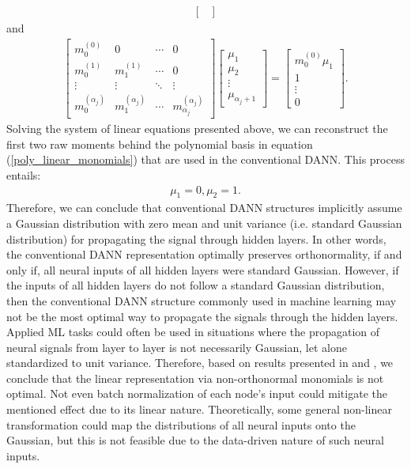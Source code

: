 \documentclass[a4paper,fleqn]{article}
\newcommand{\rw}[1]{\textcolor{blue}{#1}}
\newcommand{\del}[1]{\textcolor{red}{\sout{#1}}}
\renewcommand{\del}[1]{}
\renewcommand{\rw}[1]{#1}
\begin{document}
{\begin{eqnarray}
\begin{bmatrix}
\end{bmatrix} \nonumber
\end{eqnarray}
and 
\begin{eqnarray}
\begin{bmatrix}
m_0^{(0)} & 0 & \cdots & 0 \\
m_0^{(1)} & m_1^{(1)} & \cdots & 0 \\
\vdots & \vdots & \ddots & \vdots \\
m_0^{(\alpha_j)} & m_1^{(\alpha_j)} &\cdots & m_{\alpha_j}^{(\alpha_j)}
\end{bmatrix}
\begin{bmatrix}
\mu_1 \\ \mu_2 \\ \vdots \\ \mu_{\alpha_j+1}
\end{bmatrix}
=
\begin{bmatrix}
m_0^{(0)}\mu_1\\ 1 \\  \vdots \\ 0
\end{bmatrix}.\nonumber
\end{eqnarray}
}
\rw{Solving the system of linear equations presented above, we can} reconstruct the first two raw moments behind the polynomial basis in equation (\ref{poly_linear_monomials}) \rw{that are used in the conventional DANN. This process entails}:
%
\begin{eqnarray}
\label{DANN_monomials}
  \mu_1=0, \mu_2=1.
\end{eqnarray}
%
Therefore, we can conclude that conventional DANN structures implicitly assume a Gaussian distribution with zero mean and unit variance \rw{(i.e. standard Gaussian distribution)} for propagating the signal through hidden layers. In other words, the conventional DANN representation \rw{optimally preserves orthonormality}, if and only if, all neural inputs of all hidden layers were standard Gaussian. \rw{However, if the inputs of all hidden layers do not follow a standard Gaussian distribution, then the conventional DANN structure commonly used in machine learning may not be the most optimal way to propagate the signals through the hidden layers.} \del{Apparently, applied} \rw{Applied} ML tasks could often be used in situations where the propagation of neural signals \del{form} \rw{from} layer to layer is not necessarily Gaussian, let alone standardized to unit variance. Therefore, based on \rw{results presented in} \cite{OladNowak_RESS2012} and \cite{oladyshkin2018incomplete}, we \rw{conclude that } \del{consider} the linear representation via \rw{non-orthonormal} monomials \rw{is} \del{to be maximum} not optimal. %
Not even batch normalization \cite{ioffe2015batch} of each node's input could mitigate the mentioned effect due to its linear nature. Theoretically, some general non-linear transformation could map the distributions of all neural inputs onto the Gaussian, but this is not feasible due to the  data-driven nature of such neural inputs.
\end{document}
